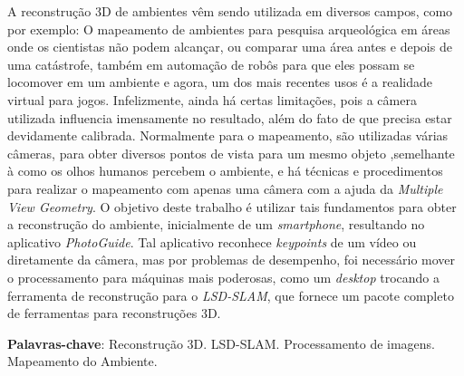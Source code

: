 \setlength{\absparsep}{18pt} %
\begin{resumo}
A reconstrução 3D de ambientes vêm sendo utilizada em diversos campos, como por exemplo: O mapeamento de ambientes para pesquisa arqueológica em áreas onde os cientistas não podem alcançar, ou comparar uma área antes e depois de uma catástrofe\cite{SLAMAP}, também em automação de robôs para que eles possam se locomover em um ambiente e agora, um dos mais recentes usos é a realidade virtual para jogos. Infelizmente, ainda há certas limitações, pois a câmera utilizada influencia imensamente no resultado, além do fato de que precisa estar devidamente calibrada. Normalmente para o mapeamento, são utilizadas várias câmeras, para obter diversos pontos de vista para um mesmo objeto ,semelhante à como os olhos humanos percebem o ambiente, e há técnicas e procedimentos para realizar o mapeamento com apenas uma câmera com a ajuda da \textit{Multiple View Geometry}. O objetivo deste trabalho é utilizar tais fundamentos para obter a reconstrução do ambiente, inicialmente de um \textit{smartphone}, resultando no aplicativo \textit{PhotoGuide}. Tal aplicativo reconhece \textit{keypoints} de um vídeo ou diretamente da câmera, mas por problemas de desempenho, foi necessário mover o processamento para máquinas mais poderosas, como um \textit{desktop} trocando a ferramenta de reconstrução para o \textit{LSD-SLAM}, que fornece um pacote completo de ferramentas para reconstruções 3D. 

 \textbf{Palavras-chave}: Reconstrução 3D. LSD-SLAM. Processamento de imagens. Mapeamento do Ambiente.

\end{resumo}
